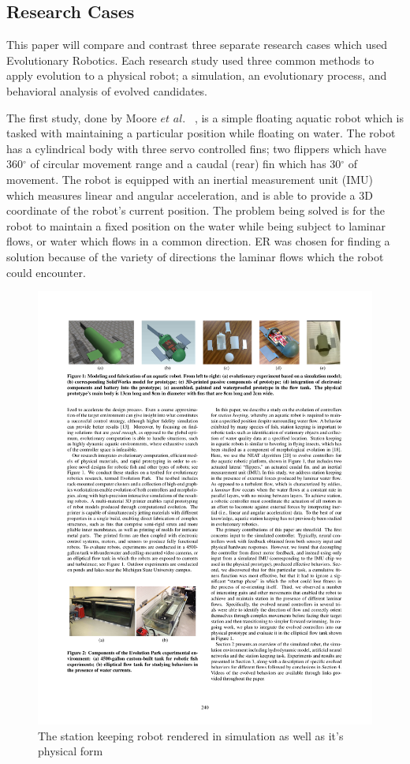 \documentclass{sig-alternate}
\begin{document}
  
  \subsection{Research Cases}
	This paper will compare and contrast three separate research cases which used Evolutionary Robotics. Each research study used three common methods to apply evolution to a physical robot; a simulation, an evolutionary process, and behavioral analysis of evolved candidates.
	
	The first study, done by Moore $et$ $al.$ ~\cite{Moore:2013:ESK:2463372.2463402}, is a simple floating aquatic robot which is tasked with maintaining a particular position while floating on water. The robot has a cylindrical body with three servo controlled fins; two flippers which have 360$^\circ$ of circular movement range and a caudal (rear) fin which has 30$^\circ$ of movement. The robot is equipped with an inertial measurement unit (IMU) which measures linear and angular acceleration, and is able to provide a 3D coordinate of the robot's current position. The problem being solved is for the robot to maintain a fixed position on the water while being subject to laminar flows, or water which flows in a common direction. ER was chosen for finding a solution because of the variety of directions the laminar flows which the robot could encounter.

\begin{figure}%
\center
  \includegraphics[scale=1]{sr2}
\caption{The station keeping robot rendered in simulation as well as it's physical form}
\label{fig:wRobot}
\end{figure}
\end{document}
